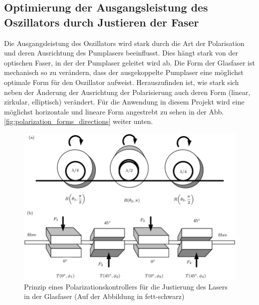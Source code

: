 \subsection{Optimierung der Ausgangsleistung des Oszillators durch Justieren der Faser}
Die Ausgangsleistung des Oszillators wird stark durch die Art der Polarisation und deren Ausrichtung des Pumplasers beeinflusst. Dies hängt stark von der optischen Faser, in der der Pumplaser geleitet wird ab. Die Form der Glasfaser ist mechanisch so zu verändern, dass der ausgekoppelte Pumplaser eine möglichst optimale Form für den Oszillator aufweist. Herauszufinden ist, wie stark sich neben der Änderung der Ausrichtung der Polarisierung auch deren Form (linear, zirkular, elliptisch) verändert. Für die Anwendung in diesem Projekt wird eine möglichst horizontale und lineare Form angestrebt zu sehen in der Abb. \ref{fig:polarization_forms_directions} weiter unten.\\

\begin{figure}[H]
    \centering
    \includegraphics[scale=0.4, trim={15mm 125mm 0 0},clip]{98_images/laser_plarizationcontroller.png}
    \caption{Prinzip eines Polarizationskontrollers für die Justierung des Lasers in der Glasfaser (Auf der Abbildung in fett-schwarz)}
    \label{fig:polarizationcontroller}
\end{figure}

